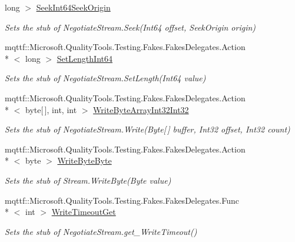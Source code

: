 \begin{DoxyCompactItemize}
long $>$ \hyperlink{class_system_1_1_net_1_1_security_1_1_fakes_1_1_stub_negotiate_stream_aa53655782a349a631e2cf74b42c95de6}{Seek\-Int64\-Seek\-Origin}
\begin{DoxyCompactList}\small\item\em Sets the stub of Negotiate\-Stream.\-Seek(\-Int64 offset, Seek\-Origin origin)\end{DoxyCompactList}\item 
mqttf\-::\-Microsoft.\-Quality\-Tools.\-Testing.\-Fakes.\-Fakes\-Delegates.\-Action\\*
$<$ long $>$ \hyperlink{class_system_1_1_net_1_1_security_1_1_fakes_1_1_stub_negotiate_stream_a1fde6f9da9a3a555fe1cd09ff747edf9}{Set\-Length\-Int64}
\begin{DoxyCompactList}\small\item\em Sets the stub of Negotiate\-Stream.\-Set\-Length(\-Int64 value)\end{DoxyCompactList}\item 
mqttf\-::\-Microsoft.\-Quality\-Tools.\-Testing.\-Fakes.\-Fakes\-Delegates.\-Action\\*
$<$ byte\mbox{[}$\,$\mbox{]}, int, int $>$ \hyperlink{class_system_1_1_net_1_1_security_1_1_fakes_1_1_stub_negotiate_stream_a9f783718b6f4ff2f160ba6df2375b6d7}{Write\-Byte\-Array\-Int32\-Int32}
\begin{DoxyCompactList}\small\item\em Sets the stub of Negotiate\-Stream.\-Write(\-Byte\mbox{[}$\,$\mbox{]} buffer, Int32 offset, Int32 count)\end{DoxyCompactList}\item 
mqttf\-::\-Microsoft.\-Quality\-Tools.\-Testing.\-Fakes.\-Fakes\-Delegates.\-Action\\*
$<$ byte $>$ \hyperlink{class_system_1_1_net_1_1_security_1_1_fakes_1_1_stub_negotiate_stream_a0eeaf0ed3fbbef1790ee4915957128e3}{Write\-Byte\-Byte}
\begin{DoxyCompactList}\small\item\em Sets the stub of Stream.\-Write\-Byte(\-Byte value)\end{DoxyCompactList}\item 
mqttf\-::\-Microsoft.\-Quality\-Tools.\-Testing.\-Fakes.\-Fakes\-Delegates.\-Func\\*
$<$ int $>$ \hyperlink{class_system_1_1_net_1_1_security_1_1_fakes_1_1_stub_negotiate_stream_a51262d17c9785e3e3c3bb49454a340fd}{Write\-Timeout\-Get}
\begin{DoxyCompactList}\small\item\em Sets the stub of Negotiate\-Stream.\-get\-\_\-\-Write\-Timeout()\end{DoxyCompactList}\item 

\end{DoxyCompactItemize}
